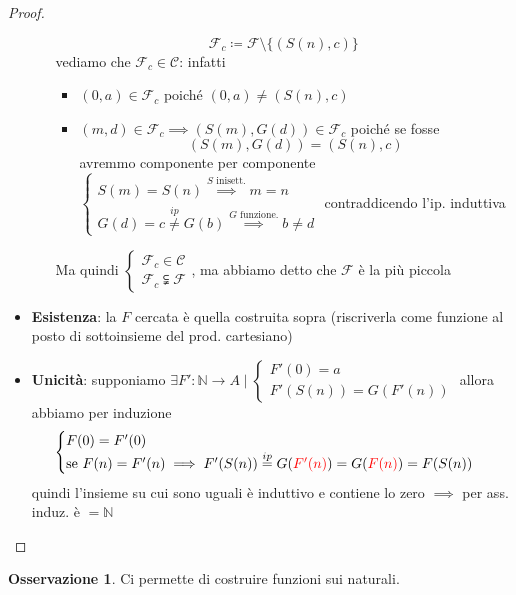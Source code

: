 \documentclass[a4paper,10pt]{article}
\theoremstyle{definition}
\theoremstyle{indentdefinition}
\theoremstyle{indentpostulate}
\theoremstyle{indenttheorem}
\theoremstyle{myremark}
\newtheorem*{rem*}{Osservazione}
\theoremstyle{indentgeneral}
\begin{document}
\begin{proof}
\begin{itemize}
\begin{itemize}
            $$\mathscr{F}_c\coloneqq \mathscr{F}\setminus \{(S(n),c)\}$$
            vediamo che $\mathscr{F}_c\in \mathscr{C}$: infatti
            \begin{itemize}
                \item $(0,a)\in\mathscr{F}_c$ poiché $(0,a)\ne (S(n),c)$
                \item $(m,d)\in\mathscr{F}_c\implies (S(m),G(d))\in \mathscr{F}_c$ poiché se fosse
                $$(S(m),G(d))=(S(n),c)$$
                avremmo componente per componente $\begin{cases}
                    S(m)=S(n) \overset{S\text{ inisett.}}{\implies} m=n \\
                    G(d)=c\overset{ip}{\ne} G(b) \overset{G\text{ funzione.}}{\implies} b\ne d 
                \end{cases}$ contraddicendo l'ip. induttiva \lightning
            \end{itemize}
            Ma quindi $\begin{cases}
                \mathscr{F}_c\in \mathscr{C} \\
                \mathscr{F}_c\subsetneqq \mathscr{F}
            \end{cases}$, ma abbiamo detto che $\mathscr{F}$ è la più piccola \lightning
        \end{itemize}
        \item \textbf{Esistenza}: la $F$ cercata è quella costruita sopra (riscriverla come funzione al posto di sottoinsieme del prod. cartesiano)
        \item \textbf{Unicità}: supponiamo $\exists F':\mathbb{N}\to A\mid \begin{cases}
            F'(0)=a \\
            F'(S(n))=G(F'(n))
        \end{cases}$ allora abbiamo per induzione
        $$\begin{cases}
            F(0)=F'(0) \\
            \text{se }F(n)=F'(n)\implies F'(S(n))\overset{ip}{=}G(\textcolor{red}{F'(n)})=G(\textcolor{red}{F(n)})=F(S(n))  
        \end{cases}$$
        quindi l'insieme su cui sono uguali è induttivo e contiene lo zero $\implies$ per ass. induz. è $=\mathbb{N}$
    \end{itemize}
\end{proof}

\begin{rem*}
    Ci permette di costruire funzioni sui naturali.
\end{rem*}
\end{document}

